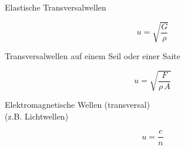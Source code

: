 \begin{minipage}{0.45\columnwidth}
    Elastische Transversalwellen
\end{minipage}
\hfill
\begin{minipage}{0.48\columnwidth}
    $$\boxed{ u = \sqrt{\frac{G}{\rho}} }$$
\end{minipage}

\begin{minipage}{0.45\columnwidth}
    Transversalwellen auf einem Seil oder einer Saite
\end{minipage}
\hfill
\begin{minipage}{0.48\columnwidth}
    $$\boxed{ u = \sqrt{\frac{F}{\rho \, A}} }$$ 
\end{minipage}

\begin{minipage}{0.45\columnwidth}
    Elektromagnetische Wellen (transversal) \\
    (z.B. Lichtwellen)
\end{minipage}
\hfill
\begin{minipage}{0.48\columnwidth}
    $$\boxed{ u = \frac{c}{n} }$$
\end{minipage}



